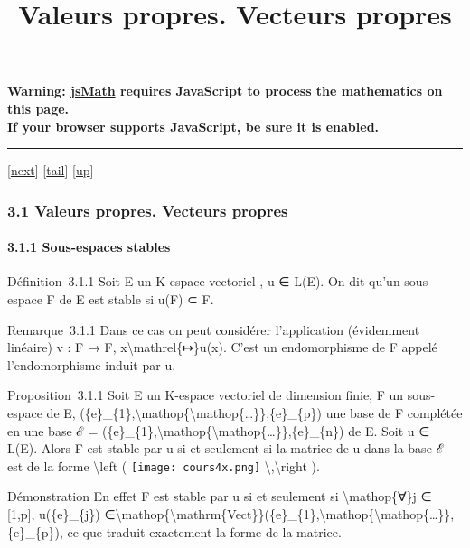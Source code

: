 \documentclass[]{article}
\title{Valeurs propres. Vecteurs propres}
\author{}
\date{}
\begin{document}
\maketitle

\textbf{Warning: \href{http://www.math.union.edu/locate/jsMath}{jsMath}
requires JavaScript to process the mathematics on this page.\\ If your
browser supports JavaScript, be sure it is enabled.}

\begin{center}\rule{3in}{0.4pt}\end{center}

{[}\href{coursse16.html}{next}{]}
{[}\hyperref[tailcoursse15.html]{tail}{]}
{[}\href{coursch4.html\#coursse15.html}{up}{]}

\subsubsection{3.1 Valeurs propres. Vecteurs propres}

\paragraph{3.1.1 Sous-espaces stables}

Définition~3.1.1 Soit E un K-espace vectoriel , u ∈ L(E). On dit qu'un
sous-espace F de E est stable si u(F) ⊂ F.

Remarque~3.1.1 Dans ce cas on peut considérer l'application (évidemment
linéaire) v : F → F, x\textbackslash{}mathrel\{↦\}u(x). C'est un
endomorphisme de F appelé l'endomorphisme induit par u.

Proposition~3.1.1 Soit E un K-espace vectoriel de dimension finie, F un
sous-espace de E,
(\{e\}\_\{1\},\textbackslash{}mathop\{\textbackslash{}mathop\{\ldots{}\}\},\{e\}\_\{p\})
une base de F complétée en une base ℰ =
(\{e\}\_\{1\},\textbackslash{}mathop\{\textbackslash{}mathop\{\ldots{}\}\},\{e\}\_\{n\})
de E. Soit u ∈ L(E). Alors F est stable par u si et seulement si la
matrice de u dans la base ℰ est de la forme \textbackslash{}left (
\texttt{[image: cours4x.png]} \textbackslash{},\textbackslash{}right ).

Démonstration En effet F est stable par u si et seulement si
\textbackslash{}mathop\{∀\}j ∈ {[}1,p{]}, u(\{e\}\_\{j\})
∈\textbackslash{}mathop\{\textbackslash{}mathrm\{Vect\}\}(\{e\}\_\{1\},\textbackslash{}mathop\{\textbackslash{}mathop\{\ldots{}\}\},\{e\}\_\{p\}),
ce que traduit exactement la forme de la matrice.
\end{document}
